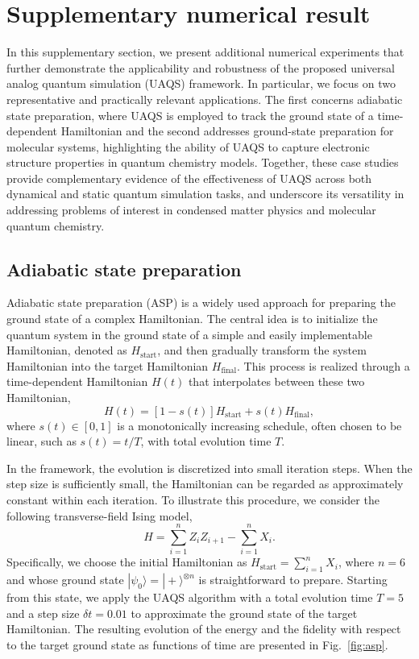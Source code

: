 \documentclass[twocolumn,
pra,aps,superscriptaddress,showpacs,amsmath,amssymb]{revtex4-2}
\begin{document}
\section{Supplementary numerical result}
In this supplementary section, we present additional numerical experiments that further demonstrate the applicability and robustness of the proposed universal analog quantum simulation (UAQS) framework. 
In particular, we focus on two representative and practically relevant applications. The first concerns adiabatic state preparation, where UAQS is employed to track the ground state of a time-dependent Hamiltonian and the second addresses ground-state preparation for molecular systems, highlighting the ability of UAQS to capture electronic structure properties in quantum chemistry models. Together, these case studies provide complementary evidence of the effectiveness of UAQS across both dynamical and static quantum simulation tasks, and underscore its versatility in addressing problems of interest in condensed matter physics and molecular quantum chemistry.
\subsection{Adiabatic state preparation}
Adiabatic state preparation (ASP) is a widely used approach for preparing the ground state of a complex Hamiltonian. The central idea is to initialize the quantum system in the ground state of a simple and easily implementable Hamiltonian, denoted as $H_{\operatorname{start}}$, and then gradually transform the system Hamiltonian into the target Hamiltonian  $H_{\operatorname{final}}$.
This process is realized through a time-dependent Hamiltonian $H(t)$ that interpolates between these two Hamiltonian,
\begin{equation}
H(t) = \left[1 - s(t)\right] H_{\text{start}} + s(t) H_{\text{final}},
\end{equation}
where $s(t) \in [0,1]$ is a monotonically increasing schedule, often chosen to be linear, such as $s(t) = t/T$, with total evolution time $T$.

In the framework, the evolution is discretized into small iteration steps. When the step size is sufficiently small, the Hamiltonian can be regarded as approximately constant within each iteration. To illustrate this procedure, we consider the following transverse-field Ising model,
\begin{equation}
H = \sum_{i=1}^{n} Z_i Z_{i+1} - \sum_{i=1}^{n} X_i.
\end{equation}
Specifically, we choose the initial Hamiltonian as $H_{\text{start}} = \sum_{i=1}^{n} X_i$, where $n=6$ and whose ground state $|\psi_0\rangle = |+\rangle^{\otimes n}$ is straightforward to prepare. Starting from this state, we apply the UAQS algorithm with a total evolution time $T = 5$ and a step size $\delta t=0.01$ to approximate the ground state of the target Hamiltonian. The resulting evolution of the energy and the fidelity with respect to the target ground state as functions of time are presented in Fig.~\ref{fig:asp}.
\end{document}
